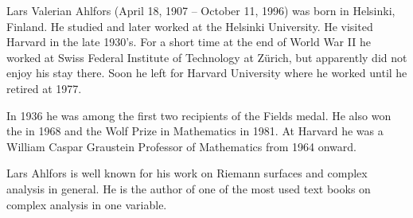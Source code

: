 \documentclass[12pt]{article}
\theoremstyle{theorem}
\theoremstyle{definition}
\theoremstyle{remark}
\begin{document}
Lars Valerian Ahlfors (April 18, 1907 -- October 11, 1996) was born in Helsinki, Finland.  He studied and later worked at the Helsinki University.  He visited Harvard in the late 1930's.  For a short time at the end of World War II he worked at Swiss Federal Institute of Technology at Z\"{u}rich, but apparently did not enjoy his stay there.  Soon he left for Harvard University where he worked until he retired at 1977.

In 1936 he was among the first two recipients of the Fields medal.  He also won
the  in 1968 and the Wolf Prize in Mathematics in 1981.  At Harvard he was
a William Caspar Graustein Professor of Mathematics from 1964 onward.

Lars Ahlfors is well known for his work on Riemann surfaces and complex analysis in general.  He is the author of one of the most used text books on complex analysis in one variable.
\end{document}
